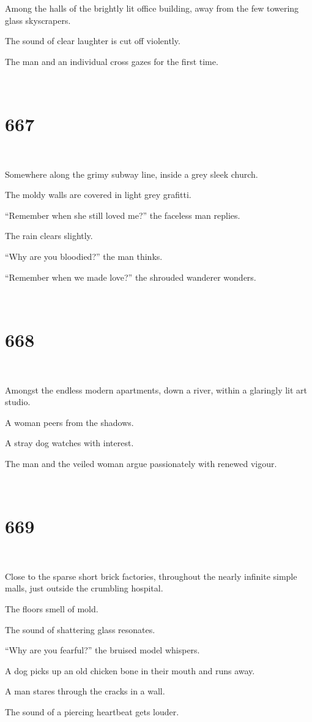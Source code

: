 \documentclass{report}
\begin{document}
Among the halls of the brightly lit office building, away from the few towering glass skyscrapers.

The sound of clear laughter is cut off violently.

The man and an individual cross gazes for the first time.

~
\chapter*{667}
~

Somewhere along the grimy subway line, inside a grey sleek church.

The moldy walls are covered in light grey grafitti.

``Remember when she still loved me?'' the faceless man replies.

The rain clears slightly.

``Why are you bloodied?'' the man thinks.

``Remember when we made love?'' the shrouded wanderer wonders.

~
\chapter*{668}
~

Amongst the endless modern apartments, down a river, within a glaringly lit art studio.

A woman peers from the shadows.

A stray dog watches with interest.

The man and the veiled woman argue passionately with renewed vigour.

~
\chapter*{669}
~

Close to the sparse short brick factories, throughout the nearly infinite simple malls, just outside the crumbling hospital.

The floors smell of mold.

The sound of shattering glass resonates.

``Why are you fearful?'' the bruised model whispers.

A dog picks up an old chicken bone in their mouth and runs away.

A man stares through the cracks in a wall.

The sound of a piercing heartbeat gets louder.
\end{document}
